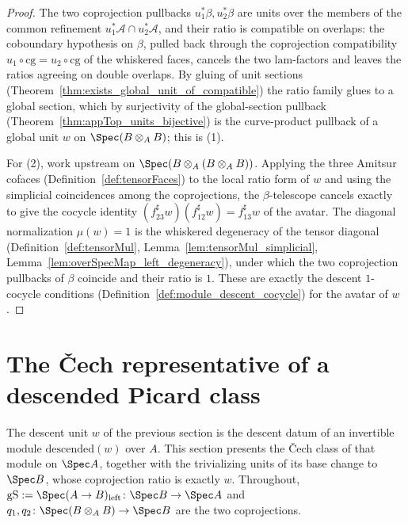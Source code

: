 \begin{proof}
  \leanok
  The two coprojection pullbacks \(u_1^{*}\beta, u_2^{*}\beta\) are units over the members of
  the common refinement \(u_1^{*}\mathcal A \cap u_2^{*}\mathcal A\), and their ratio is
  compatible on overlaps: the coboundary hypothesis on \(\beta\), pulled back through the
  coprojection compatibility \(u_1 \circ \mathrm{cg} = u_2 \circ \mathrm{cg}\) of the whiskered
  faces, cancels the two \(\mathrm{lam}\)-factors and leaves the ratios agreeing on double
  overlaps.  By gluing of unit sections (Theorem~\ref{thm:exists_global_unit_of_compatible})
  the ratio family glues to a global section, which by surjectivity of the global-section
  pullback (Theorem~\ref{thm:appTop_units_bijective}) is the curve-product pullback of a global
  unit \(w\) on \(\Spec(B \otimes_A B)\); this is (1).

  For (2), work upstream on \(\Spec(B \otimes_A (B \otimes_A B))\).  Applying the three Amitsur
  cofaces (Definition~\ref{def:tensorFaces}) to the local ratio form of \(w\) and using the
  simplicial coincidences among the coprojections, the \(\beta\)-telescope cancels exactly to
  give the cocycle identity \((f_{23}^{\sharp} w)(f_{12}^{\sharp} w) = f_{13}^{\sharp} w\) of the
  avatar.  The diagonal normalization \(\mu(w) = 1\) is the whiskered degeneracy of the tensor
  diagonal (Definition~\ref{def:tensorMul}, Lemma~\ref{lem:tensorMul_simplicial},
  Lemma~\ref{lem:overSpecMap_left_degeneracy}), under which the two coprojection pullbacks of
  \(\beta\) coincide and their ratio is \(1\).  These are exactly the descent \(1\)-cocycle
  conditions (Definition~\ref{def:module_descent_cocycle}) for the avatar of \(w\).
\end{proof}

\section{The \v Cech representative of a descended Picard class}
\label{sec:descentClassRep}

The descent unit \(w\) of the previous section is the descent datum of an invertible module
\(\mathrm{descended}(w)\) over \(A\).  This section presents the \v Cech class of that module on
\(\Spec A\), together with the trivializing units of its base change to \(\Spec B\), whose
coprojection ratio is exactly \(w\).  Throughout, \(\mathrm{gS} := \Spec(A \to B)_{\mathrm{left}}
\colon \Spec B \to \Spec A\) and \(q_1, q_2 \colon \Spec(B \otimes_A B) \to \Spec B\) are the two
coprojections.

